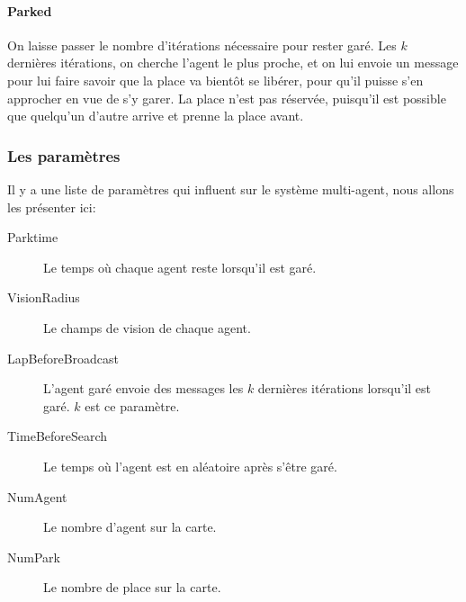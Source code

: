 \paragraph{Parked}

On laisse passer le nombre d'itérations nécessaire pour rester garé.
Les $k$ dernières itérations, on cherche l'agent le plus proche, et
on lui envoie un message pour lui faire savoir que la place va bientôt
se libérer, pour qu'il puisse s'en approcher en vue de s'y garer. La
place n'est pas réservée, puisqu'il est possible que quelqu'un d'autre
arrive et prenne la place avant.

\subsubsection{Les paramètres}
\label{sec:params}

Il y a une liste de paramètres qui influent sur le système
multi-agent, nous allons les présenter ici:

\begin{description}
\item[Parktime] Le temps où chaque agent reste lorsqu'il est garé.
\item[VisionRadius] Le champs de vision de chaque agent.
\item[LapBeforeBroadcast] L'agent garé envoie des messages les $k$
  dernières itérations lorsqu'il est garé. $k$ est ce paramètre.
\item[TimeBeforeSearch] Le temps où l'agent est en aléatoire après
  s'être garé.
\item[NumAgent] Le nombre d'agent sur la carte.
\item[NumPark] Le nombre de place sur la carte.
\end{description}


